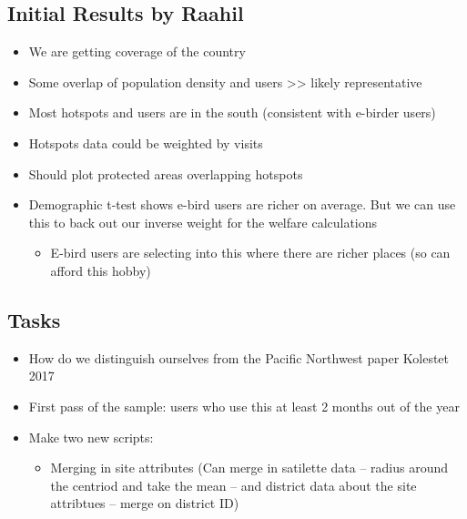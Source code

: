 \documentclass[
  letterpaper,
]{article}
\providecommand{\tightlist}{%
  \setlength{\itemsep}{0pt}\setlength{\parskip}{0pt}}\usepackage{longtable,booktabs,array}
\begin{document}
\begin{tcolorbox}
\subsection{Initial Results by Raahil}\label{initial-results-by-raahil}

\begin{itemize}
\tightlist
\item
  We are getting coverage of the country
\item
  Some overlap of population density and users
  \textgreater\textgreater{} likely representative
\item
  Most hotspots and users are in the south (consistent with e-birder
  users)
\item
  Hotspots data could be weighted by visits
\item
  Should plot protected areas overlapping hotspots
\item
  Demographic t-test shows e-bird users are richer on average. But we
  can use this to back out our inverse weight for the welfare
  calculations

  \begin{itemize}
  \tightlist
  \item
    E-bird users are selecting into this where there are richer places
    (so can afford this hobby)
  \end{itemize}
\end{itemize}

\subsection{Tasks}\label{tasks-1}

\begin{itemize}
\tightlist
\item
  How do we distinguish ourselves from the Pacific Northwest paper
  Kolestet 2017
\item
  First pass of the sample: users who use this at least 2 months out of
  the year
\item
  Make two new scripts:

  \begin{itemize}
  \tightlist
  \item
    Merging in site attributes (Can merge in satilette data -- radius
    around the centriod and take the mean -- and district data about the
    site attribtues -- merge on district ID)


\end{itemize}
\end{itemize}
\end{tcolorbox}
\end{document}
